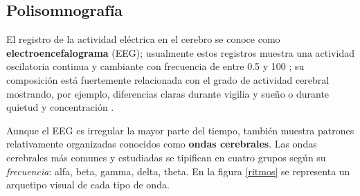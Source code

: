 


\subsection{Polisomnografía}

El registro de la actividad eléctrica en el cerebro se conoce como \textbf{electroencefalograma} 
(EEG); usualmente estos registros muestra una actividad oscilatoria continua y cambiante con 
frecuencia de entre 0.5 y 100 \hz; su composición está fuertemente 
relacionada con el grado de actividad cerebral mostrando, por ejemplo, diferencias claras durante 
vigilia y sueño o durante quietud y concentración \cite{Clark98_2}.

Aunque el EEG es irregular la mayor parte del tiempo, también muestra patrones relativamente organizadas 
conocidos como \textbf{ondas cerebrales}. Las ondas cerebrales más comunes y estudiadas se tipifican
en cuatro grupos según su \textit{frecuencia}: alfa, beta, gamma, delta, theta.
En la figura \ref{ritmos} se representa un arquetipo visual de cada tipo de onda.

